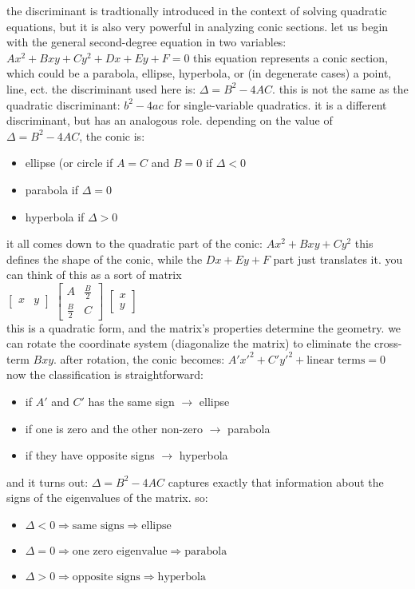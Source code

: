 \documentclass{article}
\begin{document}
the discriminant is tradtionally introduced in the context of solving quadratic equations, but it is also very powerful in analyzing conic sections. let us begin with the general second-degree equation in two variables: $Ax^2 + Bxy + Cy^2 + Dx + Ey + F = 0$ this equation represents a conic section, which could be a parabola, ellipse, hyperbola, or (in degenerate cases) a point, line, ect. the discriminant used here is: $\Delta = B^2 - 4AC$. this is not the same as the quadratic discriminant: $b^2 - 4ac$ for single-variable quadratics. it is a different discriminant, but has an analogous role. depending on the value of $\Delta = B^2 - 4AC$, the conic is:
	\begin{itemize}
		\item ellipse (or circle if $A = C$ and $B = 0$ if $\Delta < 0$
		\item parabola if $\Delta = 0$
		\item hyperbola if $\Delta > 0$
	\end{itemize}

it all comes down to the quadratic part of the conic: $Ax^2 + Bxy + Cy^2$ this defines the shape of the conic, while the $Dx + Ey + F$ part just translates it. you can think of this as a sort of matrix\\

$
\begin{bmatrix}
x & y
\end{bmatrix}
$
$
\begin{bmatrix}
A & \frac{B}{2}\\
\frac{B}{2} & C
\end{bmatrix}
$
$
\begin{bmatrix}
x\\
y
\end{bmatrix}
$\\

this is a quadratic form, and the matrix's properties determine the geometry. we can rotate the coordinate system (diagonalize the matrix) to eliminate the cross-term $Bxy$. after rotation, the conic becomes: $A'x'^2 + C'y'^2 + \text{linear terms} = 0$ now the classification is straightforward:
	\begin{itemize}
		\item if $A'$ and $C'$ has the same sign $\rightarrow$ ellipse
		\item if one is zero and the other non-zero $\rightarrow$ parabola
		\item if they have opposite signs $\rightarrow$ hyperbola
	\end{itemize}
and it turns out: $\Delta = B^2 - 4AC$ captures exactly that information about the signs of the eigenvalues of the matrix. so:
	\begin{itemize}
		\item $\Delta < 0 \Rightarrow \text{same signs} \Rightarrow \text{ellipse}$
		\item $\Delta = 0 \Rightarrow \text{one zero eigenvalue} \Rightarrow \text{parabola}$ 
		\item $\Delta > 0 \Rightarrow \text{opposite signs} \Rightarrow \text{hyperbola}$ 
	\end{itemize}
\end{document}
